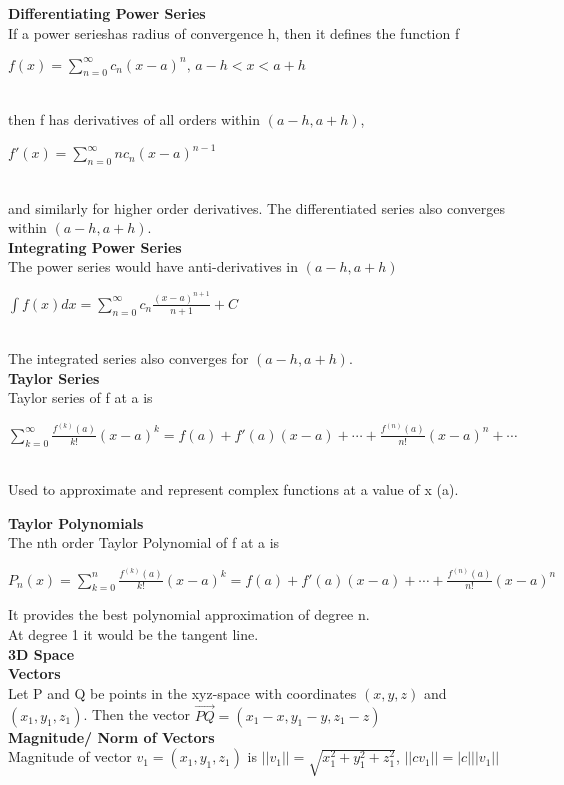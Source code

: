 \documentclass[10pt, a4paper]{article}
\begin{document}
\begin{multicols*}{3}
	\textbf{Differentiating Power Series}\\
	If a power serieshas radius of convergence h, then it defines the function f
	\centerline{$f(x) = \sum_{n = 0}^{\infty} c_n(x - a)^n \text{, } a - h < x < a + h$}\\
	then f has derivatives of all orders within $(a - h, a + h)$,\\
	\centerline{$f'(x) = \sum_{n = 0}^{\infty} nc_n(x -a)^{n - 1}$}\\
	and similarly for higher order derivatives. The differentiated series also converges within $(a - h, a + h)$.\\
	
	\textbf{Integrating Power Series}\\
	The power series would have anti-derivatives in $(a - h, a + h)$\\
	\centerline{$\int f(x)dx = \sum_{n = 0}^{\infty} c_n \frac{(x - a)^{n + 1}}{n + 1} + C$}\\
	The integrated series also converges for $(a - h, a + h)$.\\
	
	\textbf{Taylor Series}\\
	Taylor series of f at a is\\
	\centerline{$\sum_{k = 0}^{\infty} \frac{f^{(k)}(a)}{k!}(x - a)^{k} = f(a) + f'(a)(x - a) + \cdots + \frac{f^{(n)}(a)}{n!} (x - a)^n + \cdots$}\\
	Used to approximate and represent complex functions at a value of x (a).
	
	\textbf{Taylor Polynomials}\\
	The nth order Taylor Polynomial of f at a is \\
	\centerline{$P_n(x) = \sum_{k = 0}^{n} \frac{f^{(k)}(a)}{k!}(x - a)^k = f(a) + f'(a)(x - a) + \cdots + \frac{f^{(n)}(a)}{n!}(x - a)^n$} 
	It provides the best polynomial approximation of degree n.\\
	At degree 1 it would be the tangent line.\\
	
	{\normalsize\textbf{3D Space}}\\
	
	\textbf{Vectors}\\
	Let P and Q be points in the xyz-space with coordinates $(x, y, z)$ and $(x_1, y_1, z_1)$.
	Then the vector $\overrightarrow{PQ} = (x_1 - x, y_1 - y, z_1 - z)$\\
	
	\textbf{Magnitude/ Norm of Vectors}\\
	Magnitude of vector $v_1 = (x_1, y_1, z_1)$ is $||v_1|| = \sqrt{x_1^2 + y_1^2 + z_1^2}$, $||cv_1|| = |c| ||v_1||$\\
	

\end{multicols*}
\end{document}
